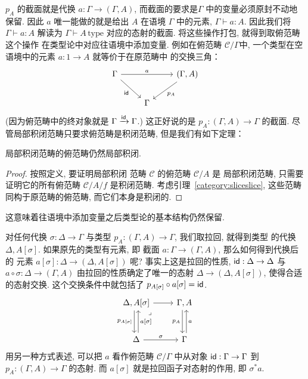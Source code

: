 \(p_A\) 的截面就是代换 \(a : \Gamma \to (\Gamma, A)\),
而截面的要求是\(\Gamma\) 中的变量必须原封不动地保留.
因此 \(a\) 唯一能做的就是给出 \(A\) 在语境 \(\Gamma\)
中的元素, \(\Gamma \vdash a : A\). 因此我们将
\(\Gamma \vdash a : A\) 解读为 \(\Gamma \vdash A\,\text{type}\)
对应的态射的截面. 将这些操作打包, 就得到取俯范畴这个操作
在类型论中对应往语境中添加变量. 例如在俯范畴 \(\mathcal C/\Gamma\)中,
一个类型在空语境中的元素 \(a : 1 \to A\) 就等价于在原范畴中
的交换三角：
\[\begin{tikzcd}
  \Gamma && {(\Gamma, A)} \\
  & \Gamma
  \arrow["{\cons{id}}"', from=1-1, to=2-2]
  \arrow["{p_A}", from=1-3, to=2-2]
  \arrow["a", from=1-1, to=1-3]
\end{tikzcd}\]
(因为俯范畴中的终对象就是 \(\Gamma \xrightarrow{\textnormal{\textsf{id}}} \Gamma\).)
这正好说的是 \(p_A : (\Gamma, A) \to \Gamma\) 的截面.
尽管局部积闭范畴只要求俯范畴是积闭范畴, 但是我们有如下定理：
\begin{theorem}\label{category:lccc:slice}
  局部积闭范畴的俯范畴仍然局部积闭.
\end{theorem}
\begin{proof}
按照定义, 要证明局部积闭
范畴 \(\mathcal C\) 的俯范畴 \(\mathcal C/A\) 是
局部积闭范畴, 只需要证明它的所有俯范畴 \(\mathcal C/A/f\)
是积闭范畴. 考虑引理~\ref{category:sliceslice},
这些范畴同构于原范畴的俯范畴, 而它们本身是积闭的.
\end{proof}
这意味着往语境中添加变量之后类型论的基本结构仍然保留.

对任何代换 \(\sigma : \Delta \to \Gamma\) 与类型
\(p_A : (\Gamma, A) \to \Gamma\), 我们取拉回, 就得到类型
的代换 \(\Delta, A[\sigma]\). 如果原先的类型有元素, 即
截面 \(a : \Gamma \to (\Gamma, A)\), 那么如何得到代换后的
元素 \(a[\sigma] : \Delta \to (\Delta, A[\sigma])\) 呢?
事实上这是拉回的性质, \(\textnormal{\textsf{id}} : \Delta \to \Delta\)
与 \(a \circ \sigma : \Delta \to (\Gamma, A)\)
由拉回的性质确定了唯一的态射 \(\Delta \to (\Delta, A[\sigma])\),
使得合适的态射交换. 这个交换条件中就包括了
\(p_{A[\sigma]} \circ a[\sigma] = \textnormal{\textsf{id}}\).
\[\begin{tikzcd}[row sep=large]
  {\Delta, A[\sigma]} & {\Gamma,A} \\
  \Delta & \Gamma
  \arrow["{p_A}"', shift right=1, from=1-2, to=2-2]
  \arrow["a"', shift right=1, from=2-2, to=1-2]
  \arrow["\sigma", from=2-1, to=2-2]
  \arrow[from=1-1, to=1-2]
  \arrow["{p_{A[\sigma]}}"', shift right=1, from=1-1, to=2-1]
  \arrow["\lrcorner"{anchor=center, pos=0.125}, draw=none, from=1-1, to=2-2]
  \arrow["{a[\sigma]}"', shift right=1, from=2-1, to=1-1]
\end{tikzcd}\]
用另一种方式表述, 可以把 \(a\) 看作俯范畴 \(\mathcal C/\Gamma\)
中从对象 \(\textnormal{\textsf{id}} : \Gamma \to \Gamma\) 到
\(p_A : (\Gamma,A) \to \Gamma\) 的态射. 而
\(a[\sigma]\) 就是拉回函子对态射的作用, 即 \(\sigma^* a\).

